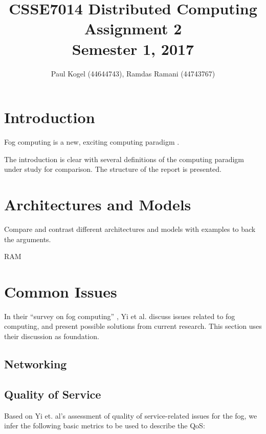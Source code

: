 \documentclass{article}
\title{CSSE7014 Distributed Computing \\
Assignment 2 \\
Semester 1, 2017}
\author{Paul Kogel (44644743), Ramdas Ramani (44743767)}
\begin{document}
\maketitle

\pagebreak
\tableofcontents\thispagestyle{plain}

\pagebreak

\section{Introduction}

Fog computing is a new, exciting computing paradigm \cite{bonomi2012fog}.

The introduction is clear with several definitions of the computing paradigm under study for comparison. The structure of the report is presented.

\section{Architectures and Models}
Compare and contrast different architectures and models with examples to back the arguments.

RAM


\section{Common Issues}

In their ``survey on fog computing'' \cite{yi2015survey}, Yi et al. discuss issues related to fog computing, and present possible solutions from current research.
This section uses their discussion as foundation.

\subsection{Networking}

\subsection{Quality of Service}
Based on Yi et. al's assessment of quality of service-related issues for the fog, we infer the following basic metrics to be used to describe the QoS:
\end{document}
